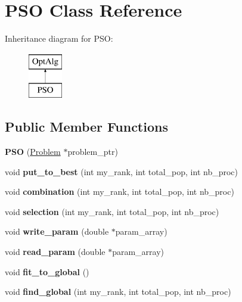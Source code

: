 \hypertarget{classPSO}{}\section{P\+S\+O Class Reference}
\label{classPSO}
Inheritance diagram for P\+S\+O\+:\begin{figure}[H]
\begin{center}
\leavevmode
\includegraphics[height=2.000000cm]{classPSO}
\end{center}
\end{figure}
\subsection*{Public Member Functions}
\begin{DoxyCompactItemize}
\item 
\hypertarget{classPSO_a19611ceb537567770359bb5ab5c94071}{}{\bfseries P\+S\+O} (\hyperlink{classProblem}{Problem} $\ast$problem\+\_\+ptr)\label{classPSO_a19611ceb537567770359bb5ab5c94071}

\item 
\hypertarget{classPSO_a1222e7701e8e369a12d293afb16fb48c}{}void {\bfseries put\+\_\+to\+\_\+best} (int my\+\_\+rank, int total\+\_\+pop, int nb\+\_\+proc)\label{classPSO_a1222e7701e8e369a12d293afb16fb48c}

\item 
\hypertarget{classPSO_aa056f6a9f5ea1d916dbd425888084c3a}{}void {\bfseries combination} (int my\+\_\+rank, int total\+\_\+pop, int nb\+\_\+proc)\label{classPSO_aa056f6a9f5ea1d916dbd425888084c3a}

\item 
\hypertarget{classPSO_a4816c088f061f3089b350948d27f3707}{}void {\bfseries selection} (int my\+\_\+rank, int total\+\_\+pop, int nb\+\_\+proc)\label{classPSO_a4816c088f061f3089b350948d27f3707}

\item 
\hypertarget{classPSO_aa0b785a7ccee6b8b6e5d40d0c8100696}{}void {\bfseries write\+\_\+param} (double $\ast$param\+\_\+array)\label{classPSO_aa0b785a7ccee6b8b6e5d40d0c8100696}

\item 
\hypertarget{classPSO_a423f9f5a0a3b5ad7f1065e12ab050c0c}{}void {\bfseries read\+\_\+param} (double $\ast$param\+\_\+array)\label{classPSO_a423f9f5a0a3b5ad7f1065e12ab050c0c}

\item 
\hypertarget{classPSO_a17dedf795cd91539f2cf4c4f39f71938}{}void {\bfseries fit\+\_\+to\+\_\+global} ()\label{classPSO_a17dedf795cd91539f2cf4c4f39f71938}

\item 
\hypertarget{classPSO_a14fe336c8e970f1fdce9d91a36db3bb9}{}void {\bfseries find\+\_\+global} (int my\+\_\+rank, int total\+\_\+pop, int nb\+\_\+proc)\label{classPSO_a14fe336c8e970f1fdce9d91a36db3bb9}

\end{DoxyCompactItemize}
